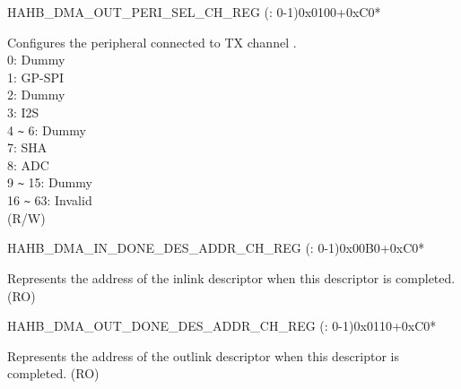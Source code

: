 \begin{register}{H}{AHB\_DMA\_OUT\_PERI\_SEL\_CH\_REG (: 0-1)}{0x0100+0xC0*}\label{regdesc:AHBDMAOUTPERISELCHNREG}
%
%
\regnewline%
\begin{regdesc}\begin{reglist}
\label{fielddesc:AHBDMAPERIOUTSELCHN}\item [AHB\_DMA\_PERI\_OUT\_SEL\_CH\regindex{n}] Configures the peripheral connected to TX channel .\\
0: Dummy\\ 1: GP-SPI\\ 2: Dummy\\ 3: I2S\\ 4 \verb+~+ 6: Dummy\\ 7: SHA\\ 8: ADC\\ 9 \verb+~+ 15: Dummy\\ 16 \verb+~+ 63: Invalid\\ (R/W)
\end{reglist}\end{regdesc}
\end{register}


\begin{register}{H}{AHB\_DMA\_IN\_DONE\_DES\_ADDR\_CH\_REG (: 0-1)}{0x00B0+0xC0*}\label{regdesc:AHBDMAINDONEDESADDRCHNREG}
%
\regnewline%
\begin{regdesc}\begin{reglist}
\label{fielddesc:AHBDMAINDONEDESADDRCHN}\item [AHB\_DMA\_IN\_DONE\_DES\_ADDR\_CH\regindex{n}] Represents the address of the inlink descriptor when this descriptor is completed. (RO)
\end{reglist}\end{regdesc}
\end{register}


\begin{register}{H}{AHB\_DMA\_OUT\_DONE\_DES\_ADDR\_CH\_REG (: 0-1)}{0x0110+0xC0*}\label{regdesc:AHBDMAOUTDONEDESADDRCHNREG}
%
\regnewline%
\begin{regdesc}\begin{reglist}
\label{fielddesc:AHBDMAOUTDONEDESADDRCHN}\item [AHB\_DMA\_OUT\_DONE\_DES\_ADDR\_CH\regindex{n}] Represents the address of the outlink descriptor when this descriptor is completed. (RO)
\end{reglist}\end{regdesc}
\end{register}


